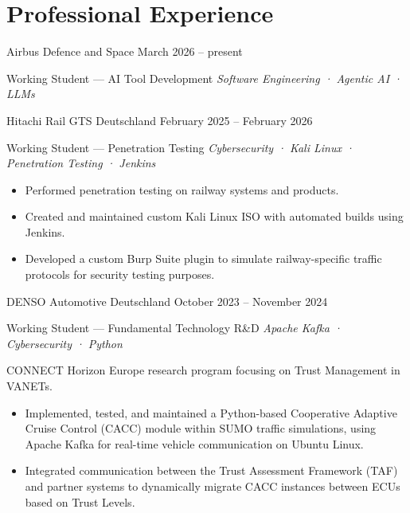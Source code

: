 \section*{Professional Experience}

{\companyfont Airbus Defence and Space} \hfill \textcolor{shadeGray}{March 2026 – present}

{\rolefont Working Student — AI Tool Development} \hfill 
\textit{\textcolor{shadeGray}{Software Engineering · Agentic AI · LLMs}}


\subsectionspacing


{\companyfont Hitachi Rail GTS Deutschland} \hfill \textcolor{shadeGray}{February 2025 – February 2026}

{\rolefont Working Student — Penetration Testing} \hfill 
\textit{\textcolor{shadeGray}{Cybersecurity · Kali Linux · Penetration Testing · Jenkins}}

\begin{itemize}
\item Performed penetration testing on railway systems and products.
\item Created and maintained custom Kali Linux ISO with automated builds using Jenkins.
\item Developed a custom Burp Suite plugin to simulate railway-specific traffic protocols for security testing purposes.

\end{itemize}


\subsectionspacing


{\companyfont DENSO Automotive Deutschland} \hfill \textcolor{shadeGray}{October 2023 – November 2024}

{\rolefont Working Student — Fundamental Technology R\&D} \hfill
\textit{\textcolor{shadeGray}{Apache Kafka · Cybersecurity · Python}}

\vspace{0.3em}
CONNECT Horizon Europe research program focusing on Trust Management in VANETs.
\begin{itemize}    
    \item Implemented, tested, and maintained a Python-based Cooperative Adaptive Cruise Control (CACC) module within SUMO traffic simulations, using Apache Kafka for real-time vehicle communication on Ubuntu Linux.
    \item Integrated communication between the Trust Assessment Framework (TAF) and partner systems to dynamically migrate CACC instances between ECUs based on Trust Levels.
\end{itemize}


